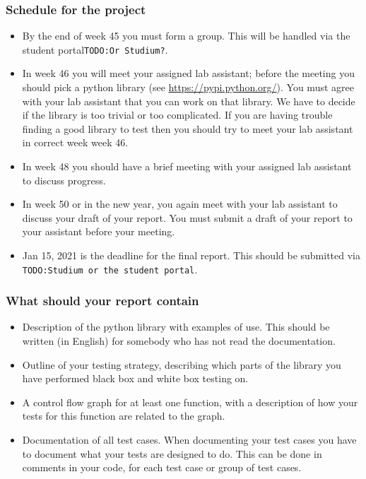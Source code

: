 \documentclass[a4paper]{article}
\newcommand{\todo}[1]{{\tt TODO:#1}}
\begin{document}
\subsubsection*{Schedule for the project}
  \begin{itemize}
  \item By the end of  week 45 you must form a
    group. This will be handled via the student portal\todo{Or Studium?}.
  \item In week 46 you will meet your assigned lab assistant; before
    the meeting you should pick a python library (see 
    \url{https://pypi.python.org/}). You must agree with your lab
    assistant that you can work on that library. We have to decide if
    the library is too trivial or too complicated. If you are having
    trouble finding a good library to test then you should try to meet
    your lab assistant in correct week week 46.
  \item In week  48 you should have a brief meeting with your assigned lab
    assistant to discuss progress.

  \item In week 50 or in the new year, you again meet with your
    lab assistant to discuss your draft of your report. You must
    submit a draft of your report to your assistant before your
    meeting.
    \item Jan 15,  2021 is  the deadline for the final
      report. This should be submitted via \todo{Studium or the student portal}.

\end{itemize}



  \subsubsection*{What should your report contain}
  \begin{itemize}
  \item Description of the python library with examples of use. 
  This should be written (in English) for somebody who has not read the documentation.
  \item Outline of your testing strategy, describing which parts of the library 
    you have performed black box and white box testing on.
  \item A control flow graph for at least one function, with a description of 
    how your tests for this function are related to the graph.
  \item Documentation of all test cases.  When documenting your test cases
    you have to document what your tests are designed to do. This can be done
    in comments in your code, for each test case or group of test cases.
  \end{itemize}
\end{document}
